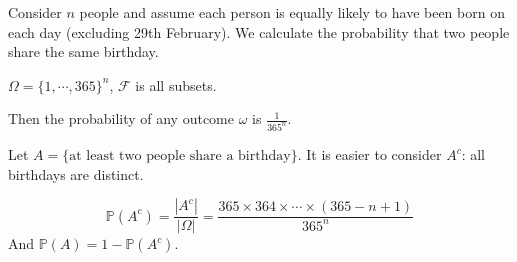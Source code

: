 \documentclass[../Main.tex]{subfiles}
\begin{document}
\begin{example}
    Consider $n$ people and assume each person is equally likely to have been born on each day (excluding 29th February). We calculate the probability that two people share the same birthday.\par
    $\Omega = \{1, \cdots, 365\}^n$, $\mathcal{F}$ is all subsets.\par
    Then the probability of any outcome $\omega$ is $\frac{1}{365^n}$.\par
    Let $A = \{\text{at least two people share a birthday}\}$. It is easier to consider $A^c$: all birthdays are distinct.\par
    \begin{equation*}
        \mathbb{P}(A^c) = \frac{|A^c|}{|\Omega|} = \frac{365 \times 364 \times \cdots \times (365-n + 1)}{365^n}
    \end{equation*}
    And $\mathbb{P}(A) = 1 - \mathbb{P}(A^c)$.
\end{example}
\end{document}
